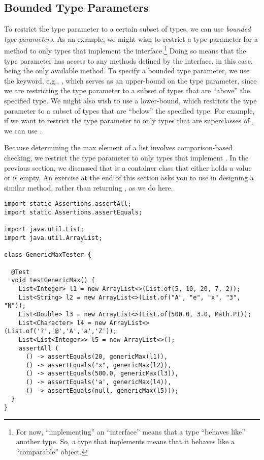 \subsection{Bounded Type Parameters}
To restrict the type parameter to a certain subset of types, we can use \emph{bounded type parameters}. 
As an example, we might wish to restrict a type parameter for a method to only types that implement the  interface.\footnote{For now, ``implementing'' an ``interface'' means that a type ``behaves like'' another type. So, a type that implements  means that it behaves like a ``comparable'' object.} 
Doing so means that the type parameter has access to any methods defined by the interface, in this case,  being the only available method. 
To specify a bounded type parameter, we use the  keyword, e.g., , which serves as an upper-bound on the type parameter, since we are restricting the type parameter to a subset of types that are ``above'' the specified type. 
We might also wish to use a lower-bound, which restricts the type parameter to a subset of types that are ``below'' the specified type. 
For example, if we want to restrict the type parameter to only types that are superclasses of , we can use .

Because determining the max element of a list involves comparison-based checking, we restrict the type parameter to only types that implement . 
In the previous section, we discussed that  is a container class that either holds a value or is empty.
An exercise at the end of this section asks you to use  in designing a similar method, rather than returning , as we do here.

\begin{lstlisting}[language=MyJava]
import static Assertions.assertAll;
import static Assertions.assertEquals;

import java.util.List;
import java.util.ArrayList;

class GenericMaxTester {
  
  @Test 
  void testGenericMax() {
    List<Integer> l1 = new ArrayList<>(List.of(5, 10, 20, 7, 2));
    List<String> l2 = new ArrayList<>(List.of("A", "e", "x", "3", "N"));
    List<Double> l3 = new ArrayList<>(List.of(500.0, 3.0, Math.PI));
    List<Character> l4 = new ArrayList<>(List.of('?','@','A','a','Z'));
    List<List<Integer>> l5 = new ArrayList<>();
    assertAll (
      () -> assertEquals(20, genericMax(l1)),
      () -> assertEquals("x", genericMax(l2)),
      () -> assertEquals(500.0, genericMax(l3)),
      () -> assertEquals('a', genericMax(l4)),
      () -> assertEquals(null, genericMax(l5)));
  }
}
\end{lstlisting}

